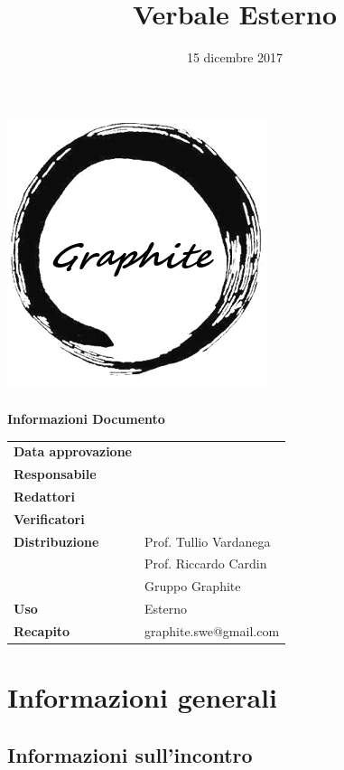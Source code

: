 \documentclass[openany,12pt,a4paper]{article}
\title{Verbale Esterno}
\author{}
\date{15 dicembre 2017}
\begin{document}
	\makeatletter
	\begin{titlepage}
		\setlength{\headsep}{0pt}  
		\begin{center}
			\includegraphics[width=0.5\linewidth]{Logo.png}\\[1em]
			{\huge \bfseries  \@title }\\[10ex]
			\textbf{\Large Informazioni Documento} \\[2em]
			\bgroup
			\def\arraystretch{1.5}
			\begin{tabular}{l|l}
				\textbf{Data approvazione} & \large \@date \\
				\textbf{Responsabile} &  \\
				\textbf{Redattori} &  \\
				\textbf{Verificatori} &  \\
				\textbf{Distribuzione} & Prof. Tullio Vardanega \\
				 & Prof. Riccardo Cardin \\
				 & Gruppo Graphite \\
				\textbf{Uso} & Esterno \\
				\textbf{Recapito} & graphite.swe@gmail.com \\
			\end{tabular}
		\egroup
		\end{center}
	\end{titlepage}
	\makeatother

	\thispagestyle{empty}
	\newpage
	
	\tableofcontents
	\newpage
	
	\section{Informazioni generali}
	
	\subsection{Informazioni sull'incontro}
	
\end{document}
